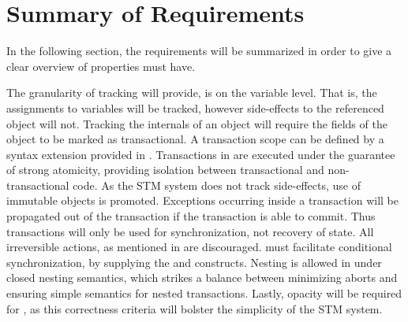 \section{Summary of Requirements}\label{sec:sum_of_req}
In the following section, the requirements will be summarized in order to give a clear overview of properties \stmnamesp must have.

The granularity of tracking \stmnamesp will provide, is on the variable level. That is, the assignments to variables will be tracked, however side-effects to the referenced object will not. Tracking the internals of an object will require the fields of the object to be marked as transactional. A transaction scope can be defined by a syntax extension provided in \stmname. Transactions in \stmnamesp are executed under the guarantee of strong atomicity, providing isolation between transactional and non-transactional code. As the \ac{STM} system does not track side-effects, use of immutable objects is promoted. Exceptions occurring inside a transaction will be propagated out of the transaction if the transaction is able to commit. Thus transactions will only be used for synchronization, not recovery of state. All irreversible actions, as mentioned in  are discouraged. \stmnamesp must facilitate conditional synchronization, by supplying the  and  constructs. Nesting is allowed in \stmnamesp under closed nesting semantics, which strikes a balance between minimizing aborts and ensuring simple semantics for nested transactions. Lastly, opacity will be required for \stmname, as this correctness criteria will bolster the simplicity of the \ac{STM} system.
\worksheetend